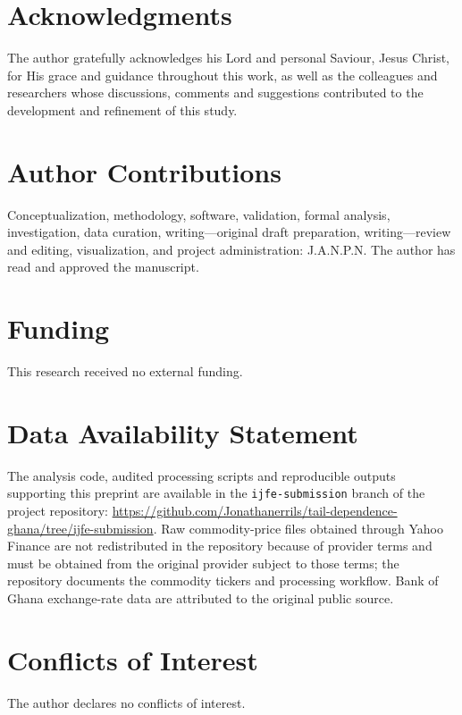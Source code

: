 \documentclass[12pt,a4paper]{article}
\begin{document}
\section*{Acknowledgments}
The author gratefully acknowledges his Lord and personal Saviour, Jesus Christ, for His grace and guidance throughout this work, as well as the colleagues and researchers whose discussions, comments and suggestions contributed to the development and refinement of this study.

\section*{Author Contributions}
Conceptualization, methodology, software, validation, formal analysis, investigation, data curation, writing---original draft preparation, writing---review and editing, visualization, and project administration: J.A.N.P.N. The author has read and approved the manuscript.

\section*{Funding}
This research received no external funding.

\section*{Data Availability Statement}
The analysis code, audited processing scripts and reproducible outputs supporting this preprint are available in the \texttt{ijfe-submission} branch of the project repository: \url{https://github.com/Jonathanerrils/tail-dependence-ghana/tree/ijfe-submission}. Raw commodity-price files obtained through Yahoo Finance are not redistributed in the repository because of provider terms and must be obtained from the original provider subject to those terms; the repository documents the commodity tickers and processing workflow. Bank of Ghana exchange-rate data are attributed to the original public source.

\section*{Conflicts of Interest}
The author declares no conflicts of interest.



\end{document}
